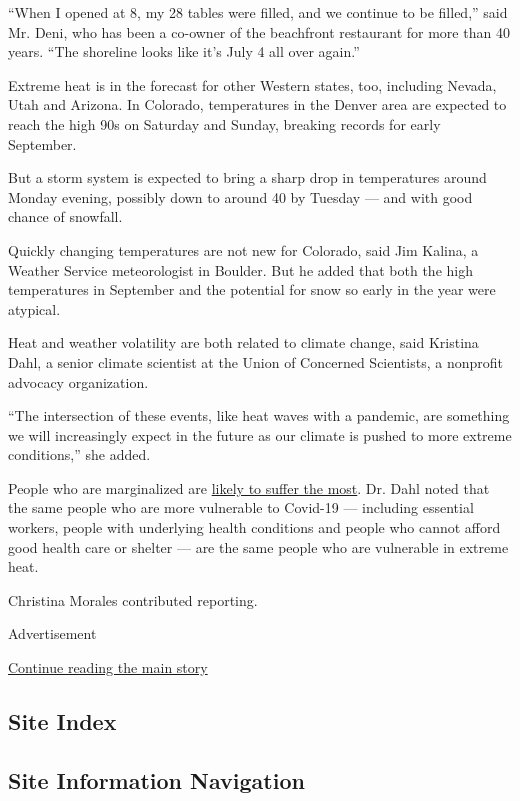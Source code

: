 ``When I opened at 8, my 28 tables were filled, and we continue to be
filled,'' said Mr. Deni, who has been a co-owner of the beachfront
restaurant for more than 40 years. ``The shoreline looks like it's July
4 all over again.''

Extreme heat is in the forecast for other Western states, too, including
Nevada, Utah and Arizona. In Colorado, temperatures in the Denver area
are expected to reach the high 90s on Saturday and Sunday, breaking
records for early September.

But a storm system is expected to bring a sharp drop in temperatures
around Monday evening, possibly down to around 40 by Tuesday --- and
with good chance of snowfall.

Quickly changing temperatures are not new for Colorado, said Jim Kalina,
a Weather Service meteorologist in Boulder. But he added that both the
high temperatures in September and the potential for snow so early in
the year were atypical.

Heat and weather volatility are both related to climate change, said
Kristina Dahl, a senior climate scientist at the Union of Concerned
Scientists, a nonprofit advocacy organization.

``The intersection of these events, like heat waves with a pandemic, are
something we will increasingly expect in the future as our climate is
pushed to more extreme conditions,'' she added.

People who are marginalized are
\href{https://www.nytimes3xbfgragh.onion/interactive/2020/08/06/climate/climate-change-inequality-heat.html}{likely
to suffer the most}. Dr. Dahl noted that the same people who are more
vulnerable to Covid-19 --- including essential workers, people with
underlying health conditions and people who cannot afford good health
care or shelter --- are the same people who are vulnerable in extreme
heat.

Christina Morales contributed reporting.

Advertisement

\protect\hyperlink{after-bottom}{Continue reading the main story}

\hypertarget{site-index}{%
\subsection{Site Index}\label{site-index}}

\hypertarget{site-information-navigation}{%
\subsection{Site Information
Navigation}\label{site-information-navigation}}

